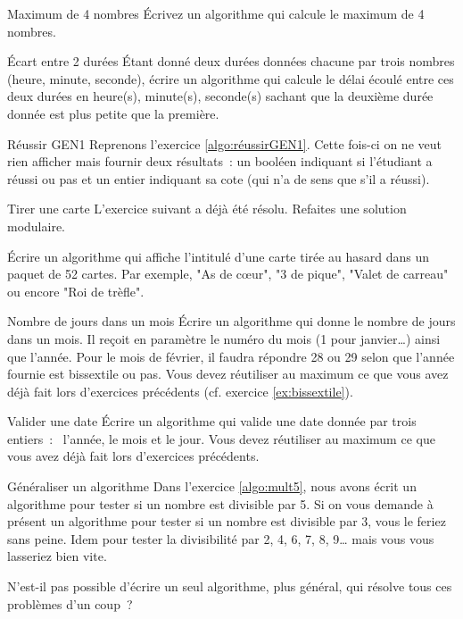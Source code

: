 	\begin{Exercice}{Maximum de 4 nombres}
		Écrivez un algorithme qui calcule le maximum de 4 nombres.
	\end{Exercice}

	\begin{Exercice}{Écart entre 2 durées}
		Étant donné deux durées données chacune par trois
		nombres (heure, minute, seconde),
		écrire un algorithme qui calcule
		le délai écoulé entre ces deux durées en heure(s), minute(s),
		seconde(s) sachant que la deuxième durée donnée 
		est plus petite que la première.
	\end{Exercice}
	
	\begin{Exercice}{Réussir GEN1}
		Reprenons l’exercice \vref{algo:réussirGEN1}.
		Cette fois-ci on ne veut rien afficher
		mais fournir deux résultats~:
		un booléen indiquant si l’étudiant a réussi ou pas
		et un entier indiquant sa cote (qui n’a de sens que s’il a réussi). 
	\end{Exercice}

	\begin{Exercice}{Tirer une carte}
		L’exercice suivant a déjà été résolu. 
		Refaites une solution modulaire.
		
		Écrire un algorithme qui affiche l’intitulé d’une carte
		tirée au hasard dans un paquet de 52 cartes.
		Par exemple, "As de cœur", "3 de pique", "Valet de carreau"
		ou encore "Roi de trèfle".
	\end{Exercice}

	\begin{Exercice}{Nombre de jours dans un mois}
		Écrire un algorithme qui donne le nombre de jours dans un mois.
		Il reçoit en paramètre le numéro du mois (1 pour janvier\dots)
		ainsi que l’année.
		Pour le mois de février, 
		il faudra répondre 28 ou 29 selon que l’année fournie
		est bissextile ou pas.
		Vous devez réutiliser au maximum ce que vous avez déjà fait
		lors d’exercices précédents (cf. exercice \vref{ex:bissextile}).
	\end{Exercice}

	\begin{Exercice}{Valider une date}
		Écrire un algorithme qui valide 
		une date donnée par trois entiers~:~ l’année, le mois et le jour.
		Vous devez réutiliser au maximum ce que vous avez déjà fait
		lors d’exercices précédents.
	\end{Exercice}
	
	\begin{Exercice}{Généraliser un algorithme}
		Dans l’exercice \vref{algo:mult5},
		nous avons écrit un algorithme 
		pour tester si un nombre est divisible par 5.
		Si on vous demande à présent
		un algorithme pour tester si un nombre est divisible par 3,
		vous le feriez sans peine.
		Idem pour tester la divisibilité par 2, 4, 6, 7, 8, 9\dots{}
		mais vous vous lasseriez bien vite.
		
		N’est-il pas possible d’écrire un seul algorithme,
		plus général, qui résolve tous ces problèmes d’un coup~?  
	\end{Exercice}
	
